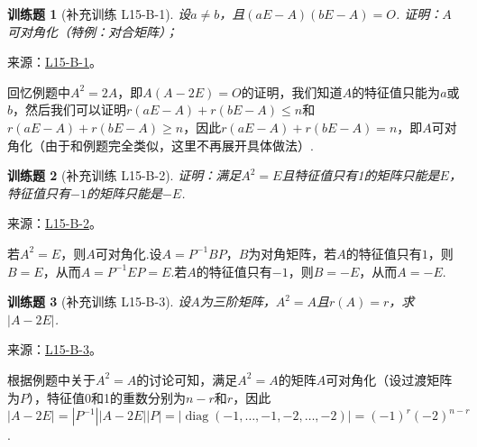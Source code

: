 \documentclass[UTF8,12pt,a4paper,fontset=fandol]{ctexart}
\newtheorem{exercise}{训练题}[section]
\begin{document}
\begin{exercise}[补充训练 L15-B-1]\label{prob:L15-B-1}
设$a\neq b$，且$(aE-A)(bE-A)=O$. 证明：$A$可对角化（特例：对合矩阵）；
\end{exercise}
\noindent 来源：\href{https://github.com/yhwu-is/Linear-Algebra-Left-Undone/blob/new/%E8%AE%B2%E4%B9%89/%E4%B8%93%E9%A2%98/15%20%E7%9B%B8%E4%BC%BC%E6%A0%87%E5%87%86%E5%BD%A2%EF%BC%9A%E5%A4%8D%E6%95%B0%E5%9F%9F%E4%B8%8A%E7%9A%84%E5%B0%9D%E8%AF%95%E4%B8%8E%E7%90%86%E8%AE%BA.tex}{L15-B-1}。
\begin{solve}
回忆例题中$A^2=2A$，即$A(A-2E)=O$的证明，我们知道$A$的特征值只能为$a$或$b$，然后我们可以证明$r(aE-A)+r(bE-A)\leqslant n$和$r(aE-A)+r(bE-A)\geqslant n$，因此$r(aE-A)+r(bE-A)=n$，即$A$可对角化（由于和例题完全类似，这里不再展开具体做法）.
\end{solve}

\begin{exercise}[补充训练 L15-B-2]\label{prob:L15-B-2}
证明：满足$A^2=E$且特征值只有1的矩阵只能是$E$，特征值只有$-1$的矩阵只能是$-E$.
\end{exercise}
\noindent 来源：\href{https://github.com/yhwu-is/Linear-Algebra-Left-Undone/blob/new/%E8%AE%B2%E4%B9%89/%E4%B8%93%E9%A2%98/15%20%E7%9B%B8%E4%BC%BC%E6%A0%87%E5%87%86%E5%BD%A2%EF%BC%9A%E5%A4%8D%E6%95%B0%E5%9F%9F%E4%B8%8A%E7%9A%84%E5%B0%9D%E8%AF%95%E4%B8%8E%E7%90%86%E8%AE%BA.tex}{L15-B-2}。
\begin{solve}
若$A^2=E$，则$A$可对角化.设$A=P^{-1}BP$，$B$为对角矩阵，若$A$的特征值只有$1$，则$B=E$，从而$A=P^{-1}EP=E$.若$A$的特征值只有$-1$，则$B=-E$，从而$A=-E$.
\end{solve}

\begin{exercise}[补充训练 L15-B-3]\label{prob:L15-B-3}
设$A$为三阶矩阵，$A^2=A$且$r(A)=r$，求$|A-2E|$.
\end{exercise}
\noindent 来源：\href{https://github.com/yhwu-is/Linear-Algebra-Left-Undone/blob/new/%E8%AE%B2%E4%B9%89/%E4%B8%93%E9%A2%98/15%20%E7%9B%B8%E4%BC%BC%E6%A0%87%E5%87%86%E5%BD%A2%EF%BC%9A%E5%A4%8D%E6%95%B0%E5%9F%9F%E4%B8%8A%E7%9A%84%E5%B0%9D%E8%AF%95%E4%B8%8E%E7%90%86%E8%AE%BA.tex}{L15-B-3}。
\begin{solve}
根据例题中关于$A^2=A$的讨论可知，满足$A^2=A$的矩阵$A$可对角化（设过渡矩阵为$P$），特征值0和1的重数分别为$n-r$和$r$，因此$|A-2E|=|P^{-1}||A-2E||P|=|\operatorname{diag}(-1,\ldots,-1,-2,\ldots,-2)|=(-1)^r(-2)^{n-r}$.
\end{solve}
\end{document}

